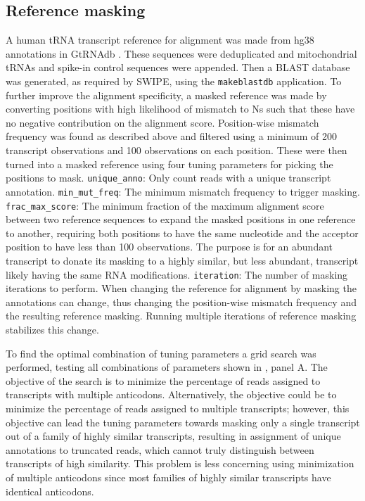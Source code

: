 \documentclass[9pt,lineno]{elife}
\begin{document}
\subsection{Reference masking}
A human tRNA transcript reference for alignment was made from hg38 annotations in GtRNAdb \citep{Chan2016-wt}.
These sequences were deduplicated and mitochondrial tRNAs and spike-in control sequences were appended.
Then a BLAST database was generated, as required by SWIPE, using the \texttt{makeblastdb} application.
To further improve the alignment specificity, a masked reference was made by converting positions with high likelihood of mismatch to Ns such that these have no negative contribution on the alignment score.
Position-wise mismatch frequency was found as described above and filtered using a minimum of 200 transcript observations and 100 observations on each position.
These were then turned into a masked reference using four tuning parameters for picking the positions to mask.
\verb|unique_anno|: Only count reads with a unique transcript annotation.
\verb|min_mut_freq|: The minimum mismatch frequency to trigger masking.
\verb|frac_max_score|: The minimum fraction of the maximum alignment score between two reference sequences to expand the masked positions in one reference to another, requiring both positions to have the same nucleotide and the acceptor position to have less than 100 observations.
The purpose is for an abundant transcript to donate its masking to a highly similar, but less abundant, transcript likely having the same RNA modifications.
\verb|iteration|: The number of masking iterations to perform.
When changing the reference for alignment by masking the annotations can change, thus changing the position-wise mismatch frequency and the resulting reference masking.
Running multiple iterations of reference masking stabilizes this change.

To find the optimal combination of tuning parameters a grid search was performed, testing all combinations of parameters shown in , panel A.
The objective of the search is to minimize the percentage of reads assigned to transcripts with multiple anticodons.
Alternatively, the objective could be to minimize the percentage of reads assigned to multiple transcripts; however, this objective can lead the tuning parameters towards masking only a single transcript out of a family of highly similar transcripts, resulting in assignment of unique annotations to truncated reads, which cannot truly distinguish between transcripts of high similarity.
This problem is less concerning using minimization of multiple anticodons since most families of highly similar transcripts have identical anticodons.
\end{document}
